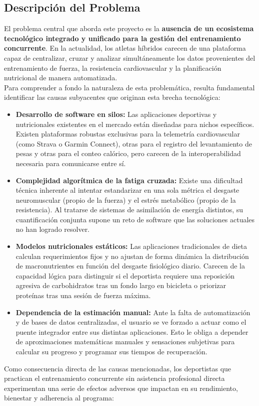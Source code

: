 \documentclass[12pt]{article}
\begin{document}
\subsection{Descripción del Problema}

El problema central que aborda este proyecto es la \textbf{ausencia de un ecosistema tecnológico integrado y unificado para la gestión del entrenamiento concurrente}. En la actualidad, los atletas híbridos carecen de una plataforma capaz de centralizar, cruzar y analizar simultáneamente los datos provenientes del entrenamiento de fuerza, la resistencia cardiovascular y la planificación nutricional de manera automatizada. \\ Para comprender a fondo la naturaleza de esta problemática, resulta fundamental identificar las causas subyacentes que originan esta brecha tecnológica:

\begin{itemize} \item \textbf{Desarrollo de software en silos:} Las aplicaciones deportivas y nutricionales existentes en el mercado están diseñadas para nichos específicos. Existen plataformas robustas exclusivas para la telemetría cardiovascular (como Strava o Garmin Connect), otras para el registro del levantamiento de pesas y otras para el conteo calórico, pero carecen de la interoperabilidad necesaria para comunicarse entre sí.


\item \textbf{Complejidad algorítmica de la fatiga cruzada:} Existe una dificultad técnica inherente al intentar estandarizar en una sola métrica el desgaste neuromuscular (propio de la fuerza) y el estrés metabólico (propio de la resistencia). Al tratarse de sistemas de asimilación de energía distintos, su cuantificación conjunta supone un reto de software que las soluciones actuales no han logrado resolver.
  
  \item \textbf{Modelos nutricionales estáticos:} Las aplicaciones tradicionales de dieta calculan requerimientos fijos y no ajustan de forma dinámica la distribución de macronutrientes en función del desgaste fisiológico diario. Carecen de la capacidad lógica para distinguir si el deportista requiere una reposición agresiva de carbohidratos tras un fondo largo en bicicleta o priorizar proteínas tras una sesión de fuerza máxima.
  
  \item \textbf{Dependencia de la estimación manual:} Ante la falta de automatización y de bases de datos centralizadas, el usuario se ve forzado a actuar como el puente integrador entre sus distintas aplicaciones. Esto le obliga a depender de aproximaciones matemáticas manuales y sensaciones subjetivas para calcular su progreso y programar sus tiempos de recuperación.
\end{itemize}
\newpage
Como consecuencia directa de las causas mencionadas, los deportistas que practican el entrenamiento concurrente sin asistencia profesional directa experimentan una serie de efectos adversos que impactan en su rendimiento, bienestar y adherencia al programa:
\end{document}
